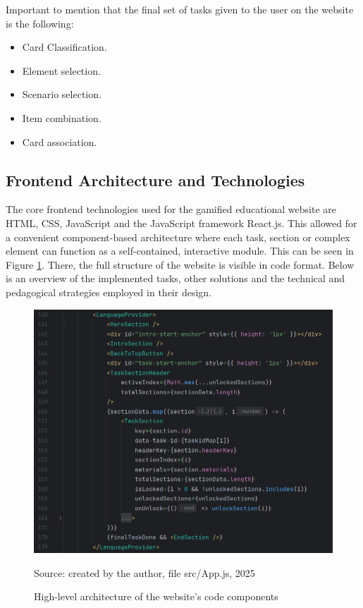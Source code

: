 Important to mention that the final set of tasks given to the user on the website is the following:
\begin{itemize}
    \item Card Classification.
    \item Element selection.
    \item Scenario selection.
    \item Item combination.
    \item Card association.
\end{itemize}

\subsection{Frontend Architecture and Technologies}

The core frontend technologies used for the gamified educational website are HTML, CSS, JavaScript and the JavaScript framework React.js. 
This allowed for a convenient component-based architecture where each task, section or complex element can function as a self-contained, interactive module. 
This can be seen in Figure \ref{fig:app_composition}. 
There, the full structure of the website is visible in code format.
Below is an overview of the implemented tasks, other solutions and the technical and pedagogical strategies employed in their design.

\begin{figure}[htbp]
 \centering
 \includegraphics[width=14cm]{Media/app_composition.png}
 \caption{High-level architecture of the website's code components}
 \label{fig:app_composition}
 {\raggedright \small{Source: created by the author, file src/App.js, 2025}\par}
\end{figure}

